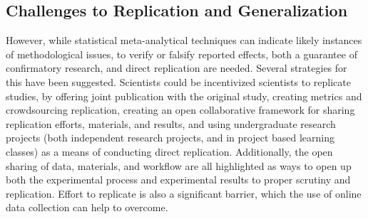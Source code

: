 \documentclass[12pt,a4paper,titlepage]{scrreprt}
\begin{document}
\subsection{Challenges to Replication and Generalization}
However, while statistical meta-analytical techniques can indicate likely instances of methodological issues, to verify or falsify reported effects, both a guarantee of confirmatory research, and direct replication are needed. Several strategies for this have been suggested. Scientists could be incentivized scientists to replicate studies, by offering joint publication with the original study\cite{koole_rewarding_2012}, creating metrics and crowdsourcing replication\cite{nosek_scientific_2012}, creating an open collaborative framework for sharing replication efforts, materials, and results\cite{collaboration_open_2012}, and using undergraduate research projects (both independent research projects, and in project based learning classes) as a means of conducting direct replication\cite{grahe_harnessing_2012}\cite{frank_teaching_2012}. Additionally, the open sharing of data, materials, and workflow\cite{giner-sorolla_science_2012}\cite{nosek_scientific_2012}\cite{miguel_promoting_2014} are all highlighted as ways to open up both the experimental process and experimental results to proper scrutiny and replication. Effort to replicate is also a significant barrier, which the use of online data collection can help to overcome\cite{grahe_harnessing_2012}.
\end{document}
